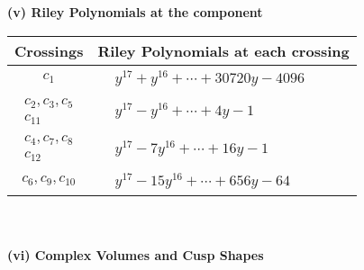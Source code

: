 \documentclass[1p]{elsarticle_modified}
\theoremstyle{definition}
\begin{document}
\newpage\renewcommand{\arraystretch}{1}
\flushleft \textbf{(v) Riley Polynomials at the component}\newline \\
\begin{tabular}{m{50pt}|m{274pt}}
Crossings & \hspace{64pt}Riley Polynomials at each crossing \\
\hline $$\begin{aligned}c_{1}\end{aligned}$$&$\begin{aligned}
&y^{17}+y^{16}+\cdots+30720 y-4096
\end{aligned}$\\
\hline $$\begin{aligned}c_{2},c_{3},c_{5}\\c_{11}\end{aligned}$$&$\begin{aligned}
&y^{17}- y^{16}+\cdots+4 y-1
\end{aligned}$\\
\hline $$\begin{aligned}c_{4},c_{7},c_{8}\\c_{12}\end{aligned}$$&$\begin{aligned}
&y^{17}-7 y^{16}+\cdots+16 y-1
\end{aligned}$\\
\hline $$\begin{aligned}c_{6},c_{9},c_{10}\end{aligned}$$&$\begin{aligned}
&y^{17}-15 y^{16}+\cdots+656 y-64
\end{aligned}$\\
\hline
\end{tabular}\\~\\
\newpage\flushleft \textbf{(vi) Complex Volumes and Cusp Shapes}
\end{document}
